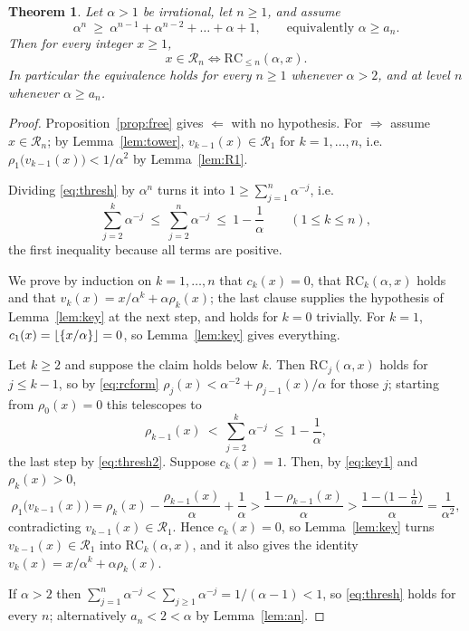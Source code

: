 \documentclass[11pt]{amsart}
\newtheorem{theorem}{Theorem}
\theoremstyle{remark}
\DeclarePairedDelimiter{\fl}{\lfloor}{\rfloor}
\newcommand{\fp}[1]{\left\{#1\right\}}
\newcommand{\RC}{\mathrm{RC}}
\begin{document}
\begin{theorem}\label{thm:A}
Let $\alpha>1$ be irrational, let $n\ge1$, and assume
\begin{equation}\label{eq:thresh}
 \alpha^{n}\ \ge\ \alpha^{n-1}+\alpha^{n-2}+\dots+\alpha+1,
 \qquad\text{equivalently } \alpha\ge a_n .
\end{equation}
Then for every integer $x\ge1$,
\[
 x\in\mathcal R_n\iff\RC_{\le n}(\alpha,x).
\]
In particular the equivalence holds for every $n\ge1$ whenever $\alpha>2$, and at level
$n$ whenever $\alpha\ge a_n$.
\end{theorem}

\begin{proof}
Proposition~\ref{prop:free} gives $\Leftarrow$ with no hypothesis. For $\Rightarrow$
assume $x\in\mathcal R_n$; by Lemma~\ref{lem:tower}, $v_{k-1}(x)\in\mathcal R_1$ for
$k=1,\dots,n$, i.e.\ $\rho_1\bigl(v_{k-1}(x)\bigr)<1/\alpha^{2}$ by Lemma~\ref{lem:R1}.

Dividing \eqref{eq:thresh} by $\alpha^{n}$ turns it into
$1\ge\sum_{j=1}^{n}\alpha^{-j}$, i.e.
\begin{equation}\label{eq:thresh2}
 \sum_{j=2}^{k}\alpha^{-j}\ \le\ \sum_{j=2}^{n}\alpha^{-j}\ \le\ 1-\frac1\alpha
 \qquad (1\le k\le n),
\end{equation}
the first inequality because all terms are positive.

We prove by induction on $k=1,\dots,n$ that $c_k(x)=0$, that $\RC_k(\alpha,x)$ holds and
that $v_k(x)=x/\alpha^{k}+\alpha\rho_k(x)$; the last clause supplies the hypothesis of
Lemma~\ref{lem:key} at the next step, and holds for $k=0$ trivially. For $k=1$,
$c_1(x)=\fl{\fp{x/\alpha}}=0$, so Lemma~\ref{lem:key} gives everything.

Let $k\ge2$ and suppose the claim holds below $k$. Then $\RC_j(\alpha,x)$ holds for
$j\le k-1$, so by \eqref{eq:rcform} $\rho_j(x)<\alpha^{-2}+\rho_{j-1}(x)/\alpha$ for
those $j$; starting from $\rho_0(x)=0$ this telescopes to
\[
 \rho_{k-1}(x)\ <\ \sum_{j=2}^{k}\alpha^{-j}\ \le\ 1-\frac1\alpha,
\]
the last step by \eqref{eq:thresh2}. Suppose $c_k(x)=1$. Then, by \eqref{eq:key1} and
$\rho_k(x)>0$,
\[
 \rho_1\bigl(v_{k-1}(x)\bigr)
 =\rho_k(x)-\frac{\rho_{k-1}(x)}{\alpha}+\frac1\alpha
 >\frac{1-\rho_{k-1}(x)}{\alpha}
 >\frac{1-\bigl(1-\tfrac1\alpha\bigr)}{\alpha}
 =\frac1{\alpha^{2}},
\]
contradicting $v_{k-1}(x)\in\mathcal R_1$. Hence $c_k(x)=0$, so Lemma~\ref{lem:key}
turns $v_{k-1}(x)\in\mathcal R_1$ into $\RC_k(\alpha,x)$, and it also gives the identity
$v_k(x)=x/\alpha^{k}+\alpha\rho_k(x)$.

If $\alpha>2$ then $\sum_{j=1}^{n}\alpha^{-j}<\sum_{j\ge1}\alpha^{-j}=1/(\alpha-1)<1$,
so \eqref{eq:thresh} holds for every $n$; alternatively $a_n<2<\alpha$ by
Lemma~\ref{lem:an}.
\end{proof}
\end{document}
